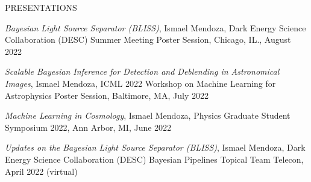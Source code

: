 \documentclass{resume} %
\begin{document}
\begin{rSection}{PRESENTATIONS}
\item \textit{Bayesian Light Source Separator (BLISS)}, Ismael Mendoza, Dark Energy Science Collaboration (DESC) Summer Meeting Poster Session, Chicago, IL., August 2022

\item \textit{Scalable Bayesian Inference for Detection and Deblending in Astronomical Images}, Ismael Mendoza, ICML 2022 Workshop on Machine Learning for Astrophysics Poster Session, Baltimore, MA, July 2022

\item \textit{Machine Learning in Cosmology}, Ismael Mendoza, Physics Graduate Student Symposium 2022, Ann Arbor, MI, June 2022

\item \textit{Updates on the Bayesian Light Source Separator (BLISS)}, Ismael Mendoza, Dark Energy Science Collaboration (DESC) Bayesian Pipelines Topical Team Telecon, April 2022 (virtual)






\end{rSection}
\end{document}
